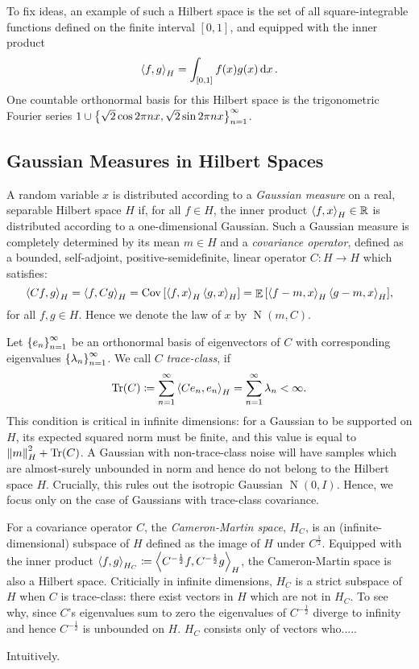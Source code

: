 To fix ideas, an example of such a Hilbert space is the set of all square-integrable functions defined on the finite interval \([0, 1]\), and equipped with the inner product
\[
  \ev{f, g}_{H} = \int_{[0, 1]} f(x)g(x) \dd{x}.
\]
One countable orthonormal basis for this Hilbert space is the trigonometric Fourier series \({1} \cup \qty{\sqrt{2} \cos 2\pi n x, \sqrt{2} \sin 2 \pi n x}_{n=1}^{\infty}\).

\subsection{Gaussian Measures in Hilbert Spaces}
A random variable \(x\) is distributed according to a \textit{Gaussian measure}  on a real, separable Hilbert space \(H\) if, for all \(f \in H\), the inner product \(\ev{f, x}_{H} \in \mathbb{R}\) is distributed according to a one-dimensional Gaussian. Such a Gaussian measure is completely determined by its mean \(m \in H\) and a \textit{covariance operator}, defined as a bounded, self-adjoint, positive-semidefinite, linear operator \(C : H \to H\) which satisfies:
\[
  \ev{Cf, g}_{H} = \ev{f, Cg}_{H} = \operatorname{Cov}\qty[\ev{f, x}_{H} \ev{g, x}_{H}] = \mathop{\mathbb{E}}\qty[\ev{f - m, x}_{H} \ev{g - m, x}_{H}],
\]
for all \(f, g \in H\). Hence we denote the law of \(x\) by \(\operatorname{N}(m, C)\).

Let \(\qty{e_{n}}_{n=1}^{\infty}\) be an orthonormal basis of eigenvectors of \(C\) with corresponding eigenvalues \(\qty{\lambda_{n}}_{n=1}^{\infty}\). We call \(C\) \textit{trace-class}, if
\[
  \operatorname{Tr}(C) \coloneqq \sum_{n=1}^{\infty} \ev{C e_{n}, e_{n}}_{H} = \sum_{n=1}^{\infty} \lambda_{n} < \infty.
\]
This condition is critical in infinite dimensions: for a Gaussian to be supported on \(H\), its expected squared norm must be finite, and this value is equal to \(\norm{m}^{2}_{H} + \operatorname{Tr}(C)\). A Gaussian with non-trace-class noise will have samples which are almost-surely unbounded in norm and hence do not belong to the Hilbert space \(H\). Crucially, this rules out the isotropic Gaussian \(\operatorname{N}(0, I)\). Hence, we focus only on the case of Gaussians with trace-class covariance.

For a covariance operator \(C\), the \textit{Cameron-Martin space}, \(H_{C}\), is an (infinite-dimensional) subspace of \(H\) defined as the image of \(H\) under \(C^{\frac{1}{2}}\). Equipped with the inner product \(\ev{f, g}_{H_{C}} \coloneqq \ev{C^{-\frac{1}{2}}f, C^{-\frac{1}{2}}g}_{H}\), the Cameron-Martin space is also a Hilbert space. Criticially in infinite dimensions,  \(H_{C}\) is a strict subspace of \(H\) when \(C\) is trace-class: there exist vectors in \(H\) which are not in \(H_{C}\). To see why, since \(C\)'s eigenvalues sum to zero the eigenvalues of \(C^{-\frac{1}{2}}\) diverge to infinity and hence \(C^{-\frac{1}{2}}\) is unbounded on \(H\). \(H_{C}\) consists only of vectors who.....

Intuitively.